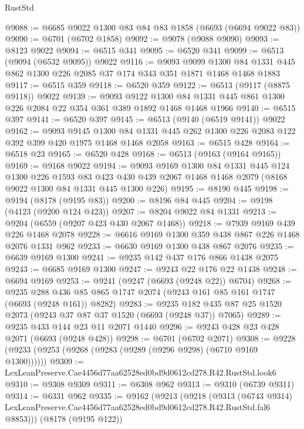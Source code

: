 \begin{lexlean}{RustStd}
\begin{coremodule}
@9088 := @6685 @9022 @1300 @83 @84 @83 @1858 (@6693 (@6694 @9022 @83))
@9090 := @6701 (@6702 @1858)
@9092 := @9078 (@9088 @9090)
@9093 := @8123 @9022
@9094 := @6515 @341
@9095 := @6520 @341
@9099 := @6513 (@9094 (@6532 @9095)) @9022
@9116 := @9093
    @9099
    @1300
    @84
    @1331
    @445
    @862
    @1300
    @226
    @2085
    @37
    @174
    @343
    @351
    @1871
    @1468
    @1468
    @1883
@9117 := @6515 @359
@9118 := @6520 @359
@9122 := @6513 (@9117 (@8875 @9118)) @9022
@9139 := @9093
    @9122
    @1300
    @84
    @1331
    @445
    @861
    @1300
    @226
    @2084
    @22
    @354
    @361
    @389
    @1892
    @1468
    @1468
    @1966
@9140 := @6515 @397
@9141 := @6520 @397
@9145 := @6513 (@9140 (@6519 @9141)) @9022
@9162 := @9093
    @9145
    @1300
    @84
    @1331
    @445
    @262
    @1300
    @226
    @2083
    @122
    @392
    @399
    @420
    @1975
    @1468
    @1468
    @2058
@9163 := @6515 @428
@9164 := @6518 @23
@9165 := @6520 @428
@9168 := @6513 (@9163 (@9164 @9165))
@9169 := @9168 @9022
@9194 := @9093
    @9169
    @1300
    @84
    @1331
    @445
    @124
    @1300
    @226
    @1593
    @83
    @423
    @430
    @439
    @2067
    @1468
    @1468
    @2079
    (@8168 @9022 @1300 @84 @1331 @445 @1300 @226)
@9195 := @8190 @445
@9198 := @9194 (@8178 (@9195 @83))
@9200 := @8196 @84 @445
@9204 := @9198 (@4123 (@9200 @124 @423))
@9207 := @8204 @9022 @84 @1331
@9213 := @9204 (@6559 (@9207 @423 @430 @2067 @1468))
@9218 := @7939 @9169 @439 @226 @1468 @2078
@9228 := @6616 @9169 @1300 @359 @438 @867 @226 @1468 @2076 @1331 @962
@9233 := @6630 @9169 @1300 @438 @867 @2076
@9235 := @6639 @9169 @1300
@9241 := @9235 @142 @437 @176 @866 @1438 @2075
@9243 := @6685 @9169 @1300
@9247 := @9243 @22 @176 @22 @1438
@9248 := @6694 @9169
@9253 := @9241 (@9247 (@6693 (@9248 @22)) @6704)
@9268 := @9235 @288 @436 @85 @865 @1747 @2074 (@9243 @161 @85 @161 @1747 (@6693 (@9248 @161)) @8282)
@9283 := @9235 @182 @435 @87 @25 @1520 @2073 (@9243 @37 @87 @37 @1520 (@6693 (@9248 @37)) @7065)
@9289 := @9235 @433 @144 @23 @11 @2071 @1440
@9296 := @9243 @428 @23 @428 @2071 (@6693 (@9248 @428))
@9298 := @6701 (@6702 @2071)
@9308 := @9228 (@9233 (@9253 (@9268 (@9283 (@9289 (@9296 @9298) (@6710 @9169 @1300))))))
@9309 := LexLeanPreserve.Cae4456d77aa62528ed0bd9d0612cd278.R42.RustStd.look6
@9310 := @9308 @9309
@9311 := @6308 @962
@9313 := @9310 (@6739 @9311)
@9314 := @6331 @962
@9335 := @9162
    (@9213
      (@9218
        (@9313
          (@6743 @9314)
          LexLeanPreserve.Cae4456d77aa62528ed0bd9d0612cd278.R42.RustStd.fal6
          @8853)))
    (@8178 (@9195 @122))

\end{coremodule}
\end{lexlean}
